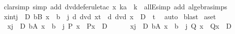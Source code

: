 \begin{isabellebody}
\ {\isacharparenleft}{\kern0pt}clarsimp\ simp\ add{\isacharcolon}{\kern0pt}\ dvd{\isacharunderscore}{\kern0pt}def{\isacharcomma}{\kern0pt}erule{\isacharunderscore}{\kern0pt}tac\ x{\isacharequal}{\kern0pt}\ {\isachardoublequoteopen}ka\ {\isacharplus}{\kern0pt}\ k{\isachardoublequoteclose}\ \ allE{\isacharcomma}{\kern0pt}simp\ add{\isacharcolon}{\kern0pt}\ algebra{\isacharunderscore}{\kern0pt}simps{\isacharparenright}{\kern0pt}\isacommand{{\isacharbraceright}{\kern0pt}}\isamarkupfalse%
\isanewline
\ \ \isamarkupfalse%
\ {\isachardoublequoteopen}{\isasymforall}{\isacharparenleft}{\kern0pt}x{\isacharcolon}{\kern0pt}{\isacharcolon}{\kern0pt}int{\isacharparenright}{\kern0pt}{\isachardot}{\kern0pt}{\isacharparenleft}{\kern0pt}{\isasymforall}j{\isasymin}{\isacharbraceleft}{\kern0pt}{}\ {\isachardot}{\kern0pt}{\isachardot}{\kern0pt}\ D{\isacharbraceright}{\kern0pt}{\isachardot}{\kern0pt}\ {\isasymforall}b{\isasymin}B{\isachardot}{\kern0pt}\ x\ {\isasymnoteq}\ b\ {\isacharplus}{\kern0pt}\ j{\isacharparenright}{\kern0pt}{\isasymlongrightarrow}\ {\isacharparenleft}{\kern0pt}{\isasymnot}d\ dvd\ x{\isacharplus}{\kern0pt}t{\isacharparenright}{\kern0pt}\ {\isasymlongrightarrow}\ {\isacharparenleft}{\kern0pt}{\isasymnot}d\ dvd\ {\isacharparenleft}{\kern0pt}x\ {\isacharminus}{\kern0pt}\ D{\isacharparenright}{\kern0pt}\ {\isacharplus}{\kern0pt}\ t{\isacharparenright}{\kern0pt}{\isachardoublequoteclose}\ \isamarkupfalse%
\ auto\isanewline
{}\isamarkupfalse%
\ blast%
\endisatagproof
{\isafoldproof}%
%
\isadelimproof
\isanewline
%
\endisadelimproof
\isanewline
{}\isamarkupfalse%
\ aset{\isacharcolon}{\kern0pt}\isanewline
\ \ {\isachardoublequoteopen}{\isasymlbrakk}{\isasymforall}x{\isachardot}{\kern0pt}{\isacharparenleft}{\kern0pt}{\isasymforall}j{\isasymin}{\isacharbraceleft}{\kern0pt}{}\ {\isachardot}{\kern0pt}{\isachardot}{\kern0pt}\ D{\isacharbraceright}{\kern0pt}{\isachardot}{\kern0pt}\ {\isasymforall}b{\isasymin}A{\isachardot}{\kern0pt}\ x\ {\isasymnoteq}\ b\ {\isacharminus}{\kern0pt}\ j{\isacharparenright}{\kern0pt}{\isasymlongrightarrow}\ P\ x\ {\isasymlongrightarrow}\ P{\isacharparenleft}{\kern0pt}x\ {\isacharplus}{\kern0pt}\ D{\isacharparenright}{\kern0pt}\ {\isacharsemicolon}{\kern0pt}\isanewline
\ \ \ \ \ {\isasymforall}x{\isachardot}{\kern0pt}{\isacharparenleft}{\kern0pt}{\isasymforall}j{\isasymin}{\isacharbraceleft}{\kern0pt}{}\ {\isachardot}{\kern0pt}{\isachardot}{\kern0pt}\ D{\isacharbraceright}{\kern0pt}{\isachardot}{\kern0pt}\ {\isasymforall}b{\isasymin}A{\isachardot}{\kern0pt}\ x\ {\isasymnoteq}\ b\ {\isacharminus}{\kern0pt}\ j{\isacharparenright}{\kern0pt}{\isasymlongrightarrow}\ Q\ x\ {\isasymlongrightarrow}\ Q{\isacharparenleft}{\kern0pt}x\ {\isacharplus}{\kern0pt}\ D{\isacharparenright}{\kern0pt}{\isasymrbrakk}\ {\isasymLongrightarrow}\ \isanewline

\end{isabellebody}
